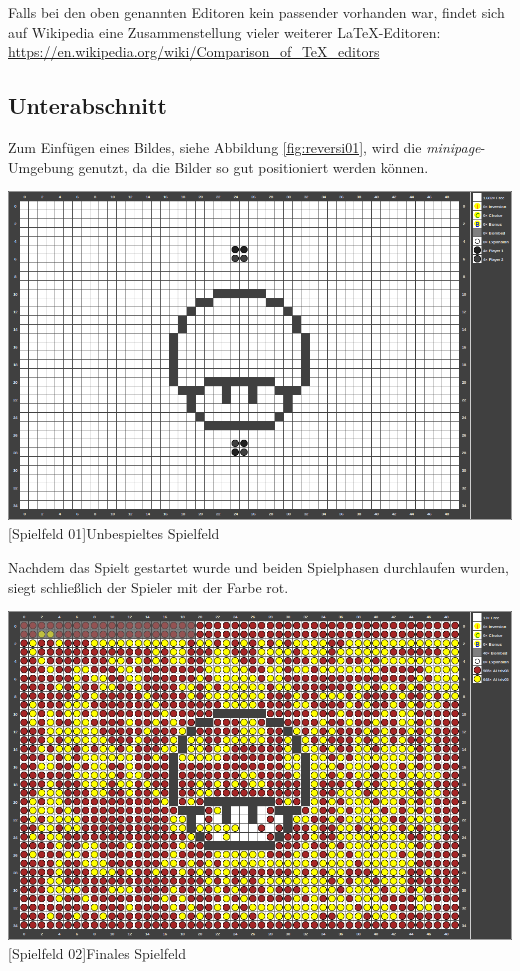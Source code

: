 \documentclass[12pt,a4paper,bibliography=totocnumbered,listof=totocnumbered]{scrartcl}
\begin{document}
    Falls bei den oben genannten Editoren kein passender vorhanden war, findet sich auf Wikipedia eine Zusammenstellung vieler weiterer \LaTeX-Editoren:\\[1em]
    \hspace*{3cm}\url{https://en.wikipedia.org/wiki/Comparison_of_TeX_editors}


    \subsection{Unterabschnitt}
    Zum Einfügen eines Bildes, siehe Abbildung \ref{fig:reversi01}, wird die \textit{minipage}-Umgebung genutzt, da die Bilder so gut positioniert werden können.

    \vspace{1em}
    \begin{minipage}{\linewidth}
        \centering
        \includegraphics[width=0.6\linewidth]{pics/gamefield01.png}
        [Spielfeld 01]{Unbespieltes Spielfeld\footnotemark }
        \label{fig:reversi01}
    \end{minipage}

    Nachdem das Spielt gestartet wurde und beiden Spielphasen durchlaufen wurden, siegt schließlich der Spieler mit der Farbe rot.

    \vspace{1em}
    \begin{minipage}{\linewidth}
        \centering
        \includegraphics[width=0.6\linewidth]{pics/gamefield02.png}
        [Spielfeld 02]{Finales Spielfeld\footnotemark }
        \label{fig:reversi2}
    \end{minipage}
    
\end{document}
